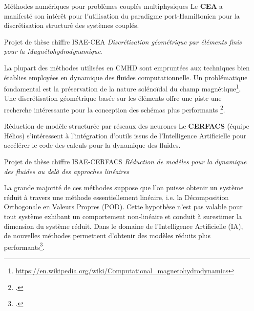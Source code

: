 \documentclass[aspectratio=169, french]{beamer}
\begin{document}
\begin{frame}{Méthodes numériques pour problèmes couplés multiphysiques}
Le \textbf{CEA} a manifesté son intérêt pour l'utilisation du paradigme port-Hamiltonien pour la discrétisation structuré des systèmes couplés.

\begin{block}{Projet de thèse chiffre ISAE-CEA}
	\textit{Discrétisation géométrique par éléments finis pour la Magnétohydrodynamique.}
\end{block}

\begin{tcolorbox}
La plupart des méthodes utilisées en CMHD sont empruntées aux techniques bien établies employées en dynamique des fluides computationnelle. Un problématique fondamental est la préservation de la nature solénoïdal du champ magnétique\footnote{\url{https://en.wikipedia.org/wiki/Computational_magnetohydrodynamics}}. Une discrétisation géométrique basée sur les éléments offre une piste une recherche intéressante pour la conception des schémas plus performants \footcite{hiptmair2018div}.
\end{tcolorbox}	
	
\end{frame}

\begin{frame}{Réduction de modèle structurée par réseaux des neurones}
Le \textbf{CERFACS} (équipe Hélios) s'intéressent à l'intégration d'outils issus de l'Intelligence Artificielle pour accélérer le code des calculs pour la dynamique des fluides.

\begin{block}{Projet de thèse chiffre ISAE-CERFACS}
\textit{Réduction de modèles pour la dynamique des fluides au delà des approches linéaires}
\end{block}
\begin{tcolorbox}
La grande majorité de ces méthodes suppose que l’on puisse obtenir un système réduit à travers une méthode essentiellement linéaire, i.e. la Décomposition Orthogonale en Valeurs Propres (POD). Cette hypothèse n’est pas valable pour tout système exhibant un comportement non-linéaire et
conduit à surestimer la dimension du système réduit. Dans le domaine de l’Intelligence Artificielle (IA), de nouvelles méthodes permettent d’obtenir des modèles réduits plus performants\footcite{lee2020}.
\end{tcolorbox}

\end{frame}
\end{document}

